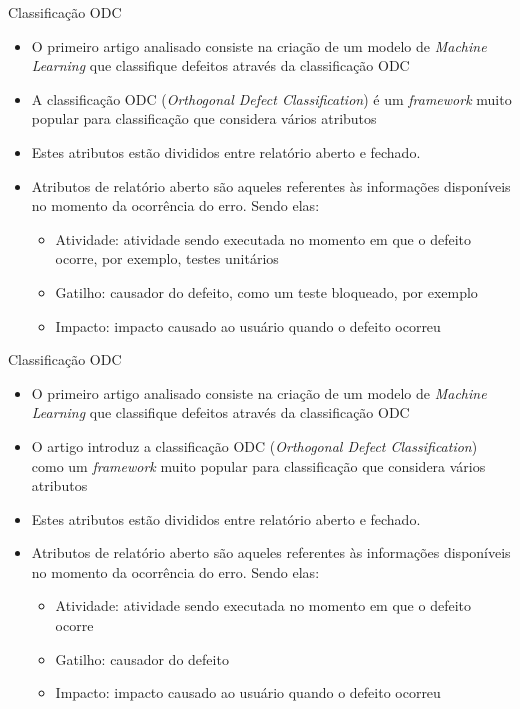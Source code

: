 \documentclass[brazilian]{beamer}
\begin{document}
\begin{frame}{Classificação ODC}
    \begin{itemize}
        \item O primeiro artigo analisado \cite{automatic_odc_using_ml} consiste na criação de um modelo de \emph{Machine Learning} que classifique defeitos através da classificação ODC
        \item A classificação ODC (\textit{Orthogonal Defect Classification}) é um \textit{framework} muito popular para classificação que considera vários atributos
        \item Estes atributos estão divididos entre relatório aberto e fechado. 
        \item Atributos de relatório aberto são aqueles referentes às informações disponíveis no momento da ocorrência do erro. Sendo elas:
        \begin{itemize}
            \item Atividade: atividade sendo executada no momento em que o defeito ocorre, por exemplo, testes unitários
            \item Gatilho: causador do defeito, como um teste bloqueado, por exemplo
            \item Impacto: impacto causado ao usuário quando o defeito ocorreu
        \end{itemize}
    \end{itemize}
\end{frame}

\begin{frame}{Classificação ODC}
    \begin{itemize}
        \item O primeiro artigo analisado \cite{automatic_odc_using_ml} consiste na criação de um modelo de \emph{Machine Learning} que classifique defeitos através da classificação ODC
        \item O artigo introduz a classificação ODC (\textit{Orthogonal Defect Classification}) como um \textit{framework} muito popular para classificação que considera vários atributos
        \item Estes atributos estão divididos entre relatório aberto e fechado. 
        \item Atributos de relatório aberto são aqueles referentes às informações disponíveis no momento da ocorrência do erro. Sendo elas:
        \begin{itemize}
            \item Atividade: atividade sendo executada no momento em que o defeito ocorre
            \item Gatilho: causador do defeito
            \item Impacto: impacto causado ao usuário quando o defeito ocorreu
        \end{itemize}
    \end{itemize}
\end{frame}
\end{document}
